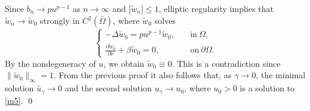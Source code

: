 \documentclass[12pt,reqno]{amsart}
\numberwithin{equation}{section}
\theoremstyle{definition}
\begin{document}
Since $b_n \to p u^{p-1}$ as $n \to \infty$ and $|\tilde{w}_n|\le 1$, elliptic regularity implies that $\tilde{w}_n \to \tilde{w}_0$ strongly in $C^2(\bar{\Omega})$, where $\tilde{w}_0$ solves 
\begin{equation}
\begin{cases}
-\Delta \tilde{w}_0=pu^{p-1}\tilde{w}_0,\quad &\text{in}\  \Omega,\\
\frac{\partial \tilde{w}_0}{\partial\nu}+\beta\tilde{w}_0=0, &\text{on}\ \partial\Omega.
\end{cases}
\end{equation}
By the nondegeneracy of $u$, we obtain $\tilde{w}_0\equiv 0$. This is a contradiction since $\|\tilde{w}_0\|_\infty=1$. From the previous proof it also follows that,  as $\gamma \to 0$,  the minimal solution $\bar u_\gamma \to 0$ and the second solution $u_\gamma \to u_0$, where $u_0>0$ is a solution to \eqref{m5}.
\qed




 
\end{document}
